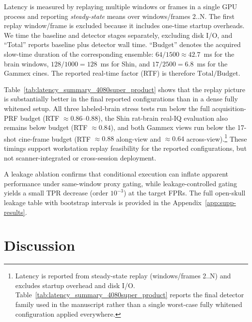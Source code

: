 \documentclass[11pt]{article}
\newif\ifSTAPPAPERONLY
\newcommand{\SuppOrApp}[1]{\ifSTAPPAPERONLY Supplementary Material\else Appendix~\ref{#1}\fi}
\begin{document}
Latency is measured by replaying multiple windows or frames in a single GPU process and reporting \emph{steady-state} means over windows/frames 2..N. The first replay window/frame is excluded because it includes one-time startup overheads. We time the baseline and detector stages separately, excluding disk I/O, and ``Total'' reports baseline plus detector wall time. ``Budget'' denotes the acquired slow-time duration of the corresponding ensemble: $64/1500\approx 42.7$~ms for the brain windows, $128/1000=128$~ms for Shin, and $17/2500=6.8$~ms for the Gammex cines. The reported real-time factor (RTF) is therefore $\text{Total}/\text{Budget}$.



Table~\ref{tab:latency_summary_4080super_product} shows that the replay picture is substantially better in the final reported configurations than in a dense fully whitened setup. All three labeled-brain stress tests run below the full acquisition-PRF budget (RTF $\approx 0.86$--$0.88$), the Shin rat-brain real-IQ evaluation also remains below budget (RTF $\approx 0.84$), and both Gammex views run below the 17-shot cine-frame budget (RTF $\approx 0.88$ along-view and $\approx 0.64$ across-view).\footnote{Latency is reported from steady-state replay (windows/frames 2..N) and excludes startup overhead and disk I/O. Table~\ref{tab:latency_summary_4080super_product} reports the final detector family used in the manuscript rather than a single worst-case fully whitened configuration applied everywhere.} These timings support workstation replay feasibility for the reported configurations, but not scanner-integrated or cross-session deployment.

A leakage ablation confirms that conditional execution can inflate apparent performance under same-window proxy gating, while leakage-controlled gating yields a small TPR decrease (order $10^{-3}$) at the target FPRs. The full open-skull leakage table with bootstrap intervals is provided in the \SuppOrApp{app:supp-results}.

\FloatBarrier
\section{Discussion}
\label{sec:discussion}
\end{document}
